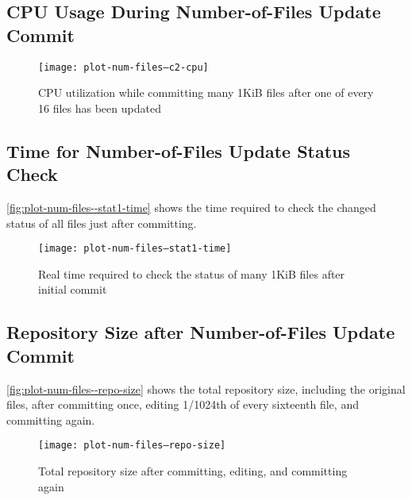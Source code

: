 %


\subsection{CPU Usage During Number-of-Files Update Commit}


\begin{figure}[p]
    \caption{CPU utilization while committing many 1KiB files after one of every
        \num{16} files has been updated}
  \label{fig:plot-num-files--c2-cpu}
  \centering
    \texttt{[image: plot-num-files--c2-cpu]}
\end{figure}

%


\subsection{Time for Number-of-Files Update Status Check}

\autoref{fig:plot-num-files--stat1-time} shows the time
required to check the changed status of all files just after committing.


\begin{figure}[p]
  \caption{Real time required to check the status of many 1KiB files after
  initial commit}
  \label{fig:plot-num-files--stat1-time}
  \centering
    \texttt{[image: plot-num-files--stat1-time]}
\end{figure}

%


\subsection{Repository Size after Number-of-Files Update Commit}

\autoref{fig:plot-num-files--repo-size} shows the total
repository size, including the original files, after committing once, editing
1/1024th of every sixteenth file, and committing again.


\begin{figure}[p]
  \caption{Total repository size after committing, editing, and committing again}
  \label{fig:plot-num-files--repo-size}
  \centering
    \texttt{[image: plot-num-files--repo-size]}
\end{figure}


